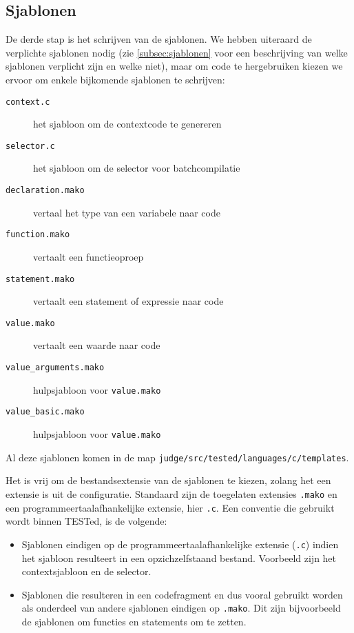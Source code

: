 \subsection{Sjablonen}\label{subsec:manual-sjablonen}

De derde stap is het schrijven van de sjablonen.
We hebben uiteraard de verplichte sjablonen nodig (zie \cref{subsec:sjablonen} voor een beschrijving van welke sjablonen verplicht zijn en welke niet), maar om code te hergebruiken kiezen we ervoor om enkele bijkomende sjablonen te schrijven:

\begin{description}
    \item[\texttt{context.c}] het sjabloon om de contextcode te genereren
    \item[\texttt{selector.c}] het sjabloon om de selector voor batchcompilatie
    \item[\texttt{declaration.mako}] vertaal het type van een variabele naar code
    \item[\texttt{function.mako}] vertaalt een functieoproep
    \item[\texttt{statement.mako}] vertaalt een statement of expressie naar code
    \item[\texttt{value.mako}] vertaalt een waarde naar code
    \item[\texttt{value\_arguments.mako}] hulpsjabloon voor \texttt{value.mako}
    \item[\texttt{value\_basic.mako}] hulpsjabloon voor \texttt{value.mako}
\end{description}

Al deze sjablonen komen in de map \texttt{judge/src/tested/languages/c/templates}.

Het is vrij om de bestandsextensie van de sjablonen te kiezen, zolang het een extensie is uit de configuratie.
Standaard zijn de toegelaten extensies \texttt{.mako} en een programmeertaalafhankelijke extensie, hier \texttt{.c}.
Een conventie die gebruikt wordt binnen TESTed, is de volgende:

\begin{itemize}
    \item Sjablonen eindigen op de programmeertaalafhankelijke extensie (\texttt{.c}) indien het sjabloon resulteert in een opzichzelfstaand bestand.
    Voorbeeld zijn het contextsjabloon en de selector.
    \item Sjablonen die resulteren in een codefragment en dus vooral gebruikt worden als onderdeel van andere sjablonen eindigen op \texttt{.mako}.
    Dit zijn bijvoorbeeld de sjablonen om functies en statements om te zetten.
\end{itemize}

